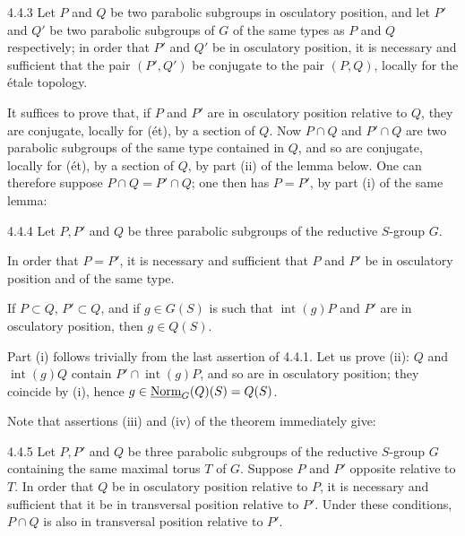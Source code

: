 \begin{corollary}{4.4.3}\label{XXVI.4.4.3}
Let $P$ and $Q$ be two parabolic subgroups in osculatory position, and let $P'$ and $Q'$ be two parabolic subgroups of $G$ of the same types as $P$ and $Q$ respectively; in order that $P'$ and $Q'$ be in osculatory position, it is necessary and sufficient that the pair $(P',Q')$ be conjugate to the pair $(P,Q)$, locally for the \'etale topology.
\end{corollary}
It suffices to prove that, if $P$ and $P'$ are in osculatory position relative to $Q$, they are conjugate, locally for (\'et), by a section of $Q$. Now $P\cap Q$ and $P'\cap Q$ are two parabolic subgroups of the same type contained in $Q$, and so are conjugate, locally for (\'et), by a section of $Q$, by part (ii) of the lemma below. One can therefore suppose $P\cap Q=P'\cap Q$; one then has $P=P'$, by part (i) of the same lemma:
\begin{lemma}{4.4.4}\label{XXVI.4.4.4}
Let $P,P'$ and $Q$ be three parabolic subgroups of the reductive $S$-group $G$.
\begin{enumeratei}
\item In order that $P=P'$, it is necessary and sufficient that $P$ and $P'$ be in osculatory position and of the same type.
\item If $P\subset Q$, $P'\subset Q$, and if $g\in G(S)$ is such that $\operatorname{int}(g)P$ and $P'$ are in osculatory position, then $g\in Q(S)$.
\end{enumeratei}
\end{lemma}
Part (i) follows trivially from the last assertion of 4.4.1. Let us prove (ii): $Q$ and $\operatorname{int}(g)Q$ contain $P'\cap\operatorname{int}(g)P$, and so are in osculatory position; they coincide by (i), hence $g\in\underline{\mathrm{Norm}}_G(Q)(S)=Q(S)$.

Note that assertions (iii) and (iv) of the theorem immediately give:
\begin{corollary}{4.4.5}\label{XXVI.4.4.5}
Let $P,P'$ and $Q$ be three parabolic subgroups of the reductive $S$-group $G$ containing the same maximal torus $T$ of $G$. Suppose $P$ and $P'$ opposite relative to $T$. In order that $Q$ be in osculatory position relative to $P$, it is necessary and sufficient that it be in transversal position relative to $P'$. Under these conditions, $P\cap Q$ is also in transversal position relative to $P'$.
\end{corollary}


